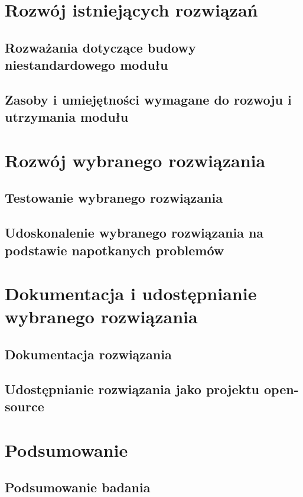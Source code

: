 \documentclass[a4paper,twoside,12pt]{book}
\begin{document}

\chapter{Rozwój istniejących rozwiązań}

\section{Rozważania dotyczące budowy niestandardowego modułu}

\section{Zasoby i umiejętności wymagane do rozwoju i utrzymania modułu}

\chapter{Rozwój wybranego rozwiązania}

\section{Testowanie wybranego rozwiązania}

\section{Udoskonalenie wybranego rozwiązania na podstawie napotkanych problemów}

\chapter{Dokumentacja i udostępnianie wybranego rozwiązania}

\section{Dokumentacja rozwiązania}

\section{Udostępnianie rozwiązania jako projektu open-source}

\chapter{Podsumowanie}

\section{Podsumowanie badania}
\end{document}
